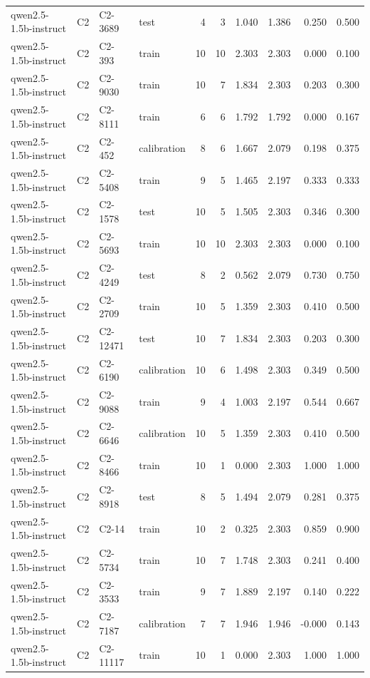 \begin{table}
\begin{tabular}{llllrrrrrr}
qwen2.5-1.5b-instruct & C2 & C2-3689 & test & 4 & 3 & 1.040 & 1.386 & 0.250 & 0.500 \\
qwen2.5-1.5b-instruct & C2 & C2-393 & train & 10 & 10 & 2.303 & 2.303 & 0.000 & 0.100 \\
qwen2.5-1.5b-instruct & C2 & C2-9030 & train & 10 & 7 & 1.834 & 2.303 & 0.203 & 0.300 \\
qwen2.5-1.5b-instruct & C2 & C2-8111 & train & 6 & 6 & 1.792 & 1.792 & 0.000 & 0.167 \\
qwen2.5-1.5b-instruct & C2 & C2-452 & calibration & 8 & 6 & 1.667 & 2.079 & 0.198 & 0.375 \\
qwen2.5-1.5b-instruct & C2 & C2-5408 & train & 9 & 5 & 1.465 & 2.197 & 0.333 & 0.333 \\
qwen2.5-1.5b-instruct & C2 & C2-1578 & test & 10 & 5 & 1.505 & 2.303 & 0.346 & 0.300 \\
qwen2.5-1.5b-instruct & C2 & C2-5693 & train & 10 & 10 & 2.303 & 2.303 & 0.000 & 0.100 \\
qwen2.5-1.5b-instruct & C2 & C2-4249 & test & 8 & 2 & 0.562 & 2.079 & 0.730 & 0.750 \\
qwen2.5-1.5b-instruct & C2 & C2-2709 & train & 10 & 5 & 1.359 & 2.303 & 0.410 & 0.500 \\
qwen2.5-1.5b-instruct & C2 & C2-12471 & test & 10 & 7 & 1.834 & 2.303 & 0.203 & 0.300 \\
qwen2.5-1.5b-instruct & C2 & C2-6190 & calibration & 10 & 6 & 1.498 & 2.303 & 0.349 & 0.500 \\
qwen2.5-1.5b-instruct & C2 & C2-9088 & train & 9 & 4 & 1.003 & 2.197 & 0.544 & 0.667 \\
qwen2.5-1.5b-instruct & C2 & C2-6646 & calibration & 10 & 5 & 1.359 & 2.303 & 0.410 & 0.500 \\
qwen2.5-1.5b-instruct & C2 & C2-8466 & train & 10 & 1 & 0.000 & 2.303 & 1.000 & 1.000 \\
qwen2.5-1.5b-instruct & C2 & C2-8918 & test & 8 & 5 & 1.494 & 2.079 & 0.281 & 0.375 \\
qwen2.5-1.5b-instruct & C2 & C2-14 & train & 10 & 2 & 0.325 & 2.303 & 0.859 & 0.900 \\
qwen2.5-1.5b-instruct & C2 & C2-5734 & train & 10 & 7 & 1.748 & 2.303 & 0.241 & 0.400 \\
qwen2.5-1.5b-instruct & C2 & C2-3533 & train & 9 & 7 & 1.889 & 2.197 & 0.140 & 0.222 \\
qwen2.5-1.5b-instruct & C2 & C2-7187 & calibration & 7 & 7 & 1.946 & 1.946 & -0.000 & 0.143 \\
qwen2.5-1.5b-instruct & C2 & C2-11117 & train & 10 & 1 & 0.000 & 2.303 & 1.000 & 1.000 \\

\end{tabular}
\end{table}
